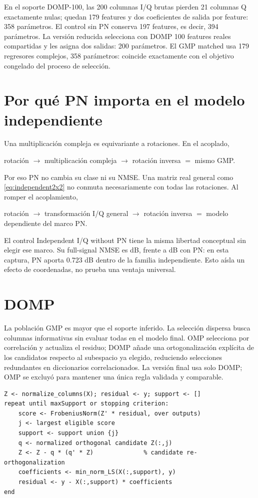 \documentclass[10pt,a4paper]{article}
\makeatletter
\newcommand{\Rval}[3]{%
  \edef\ResultValue{\csname R@#1@#2\endcsname}%
  \pgfmathprintnumber[fixed,precision=#3]{\ResultValue}}
\makeatother
\begin{document}
En el soporte DOMP-100, las 200 columnas I/Q brutas pierden 21 columnas Q
exactamente nulas; quedan 179 features y dos coeficientes de salida por feature:
358 parámetros. El control sin PN conserva 197 features, es decir, 394
parámetros. La versión reducida selecciona con DOMP 100 features reales
compartidas y les asigna dos salidas: 200 parámetros. El GMP matched usa 179
regresores complejos, 358 parámetros: coincide exactamente con el objetivo
congelado del proceso de selección.

\section{Por qué PN importa en el modelo independiente}

Una multiplicación compleja es equivariante a rotaciones. En el acoplado,
\begin{center}
rotación $\rightarrow$ multiplicación compleja $\rightarrow$ rotación inversa
$=$ mismo GMP.
\end{center}
Por eso PN no cambia su clase ni su NMSE. Una matriz real general como
\eqref{eq:independent2x2} no conmuta necesariamente con todas las rotaciones. Al
romper el acoplamiento,
\begin{center}
rotación $\rightarrow$ transformación I/Q general $\rightarrow$ rotación inversa
$=$ modelo dependiente del marco PN.
\end{center}
El control Independent I/Q without PN tiene la misma libertad conceptual sin
elegir ese marco. Su full-signal NMSE es \Rval{4}{FullSignalNMSEdB}{3} dB,
frente a \Rval{2}{FullSignalNMSEdB}{3} dB con PN: en esta captura, PN aporta
0.723 dB dentro de la familia independiente. Esto aísla un efecto de coordenadas, no prueba una
ventaja universal.

\section{DOMP}

La población GMP es mayor que el soporte inferido. La selección dispersa busca
columnas informativas sin evaluar todas en el modelo final. OMP selecciona por
correlación y actualiza el residuo; DOMP añade una ortogonalización explícita de
los candidatos respecto al subespacio ya elegido, reduciendo selecciones
redundantes en diccionarios correlacionados. La versión final usa solo DOMP; OMP
se excluyó para mantener una única regla validada y comparable.

\begin{lstlisting}[caption={Pseudocódigo resumido de DOMP.}]
Z <- normalize_columns(X); residual <- y; support <- []
repeat until maxSupport or stopping criterion:
    score <- FrobeniusNorm(Z' * residual, over outputs)
    j <- largest eligible score
    support <- support union {j}
    q <- normalized orthogonal candidate Z(:,j)
    Z <- Z - q * (q' * Z)              % candidate re-orthogonalization
    coefficients <- min_norm_LS(X(:,support), y)
    residual <- y - X(:,support) * coefficients
end
\end{lstlisting}
\end{document}
